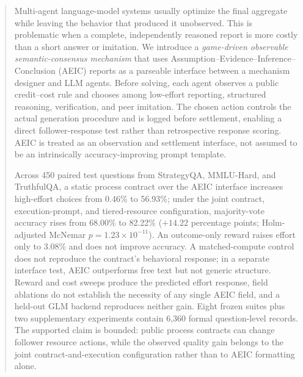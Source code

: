 \begin{abstract}
Multi-agent language-model systems usually optimize the final aggregate while leaving the behavior that produced it unobserved. This is problematic when a complete, independently reasoned report is more costly than a short answer or imitation. We introduce a \emph{game-driven observable semantic-consensus mechanism} that uses Assumption--Evidence--Inference--Conclusion (AEIC) reports as a parseable interface between a mechanism designer and LLM agents. Before solving, each agent observes a public credit--cost rule and chooses among low-effort reporting, structured reasoning, verification, and peer imitation. The chosen action controls the actual generation procedure and is logged before settlement, enabling a direct follower-response test rather than retrospective response scoring. AEIC is treated as an observation and settlement interface, not assumed to be an intrinsically accuracy-improving prompt template.

Across 450 paired test questions from StrategyQA, MMLU-Hard, and TruthfulQA, a static process contract over the AEIC interface increases high-effort choices from 0.46\% to 56.93\%; under the joint contract, execution-prompt, and tiered-resource configuration, majority-vote accuracy rises from 68.00\% to 82.22\% ($+14.22$ percentage points; Holm-adjusted McNemar $p=1.23\times10^{-11}$). An outcome-only reward raises effort only to 3.08\% and does not improve accuracy. A matched-compute control does not reproduce the contract's behavioral response; in a separate interface test, AEIC outperforms free text but not generic structure. Reward and cost sweeps produce the predicted effort response, field ablations do not establish the necessity of any single AEIC field, and a held-out GLM backend reproduces neither gain. Eight frozen suites plus two supplementary experiments contain 6,360 formal question-level records. The supported claim is bounded: public process contracts can change follower resource actions, while the observed quality gain belongs to the joint contract-and-execution configuration rather than to AEIC formatting alone.

\end{abstract}

